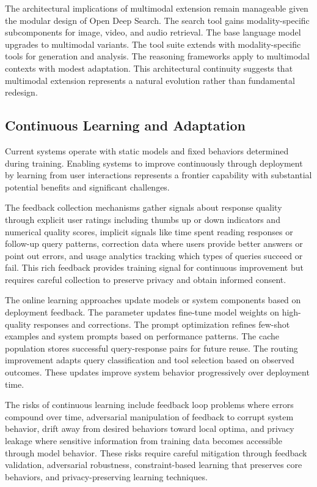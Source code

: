 The architectural implications of multimodal extension remain manageable given the modular design of Open Deep Search. The search tool gains modality-specific subcomponents for image, video, and audio retrieval. The base language model upgrades to multimodal variants. The tool suite extends with modality-specific tools for generation and analysis. The reasoning frameworks apply to multimodal contexts with modest adaptation. This architectural continuity suggests that multimodal extension represents a natural evolution rather than fundamental redesign.

\subsection{Continuous Learning and Adaptation}

Current systems operate with static models and fixed behaviors determined during training. Enabling systems to improve continuously through deployment by learning from user interactions represents a frontier capability with substantial potential benefits and significant challenges.

The feedback collection mechanisms gather signals about response quality through explicit user ratings including thumbs up or down indicators and numerical quality scores, implicit signals like time spent reading responses or follow-up query patterns, correction data where users provide better answers or point out errors, and usage analytics tracking which types of queries succeed or fail. This rich feedback provides training signal for continuous improvement but requires careful collection to preserve privacy and obtain informed consent.

The online learning approaches update models or system components based on deployment feedback. The parameter updates fine-tune model weights on high-quality responses and corrections. The prompt optimization refines few-shot examples and system prompts based on performance patterns. The cache population stores successful query-response pairs for future reuse. The routing improvement adapts query classification and tool selection based on observed outcomes. These updates improve system behavior progressively over deployment time.

The risks of continuous learning include feedback loop problems where errors compound over time, adversarial manipulation of feedback to corrupt system behavior, drift away from desired behaviors toward local optima, and privacy leakage where sensitive information from training data becomes accessible through model behavior. These risks require careful mitigation through feedback validation, adversarial robustness, constraint-based learning that preserves core behaviors, and privacy-preserving learning techniques.

